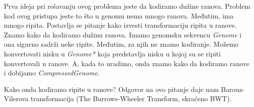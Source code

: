 Prva ideja pri rešavanju ovog problema jeste da kodiramo dužine ranova. Problem kod ovog pristupa jeste to što u genomu nema mnogo ranova. Međutim, ima mnogo ripita. Postavlja se pitanje kako izvesti transformaciju ripita u ranove.  Znamo kako da kodiramo dužinu ranova. Imamo genomsku sekvencu \textit{Genome} i ona sigurno sadrži neke ripite. Međutim, za njih ne znamo kodiranje. Možemo konvertovati nisku u \textit{Genome*} koja predstavlja nisku u kojoj su se ripiti konvertovali u ranove. A, kada to uradimo, onda znamo kako da kodiramo ranove i dobijamo \textit{CompressedGenome}. 

Kako onda kodiramo ripite u ranove? Odgovor na ovo pitanje daje nam Barouz-Vilerova transformacija (The Burrows-Wheeler Transform, skraćeno BWT).
 

